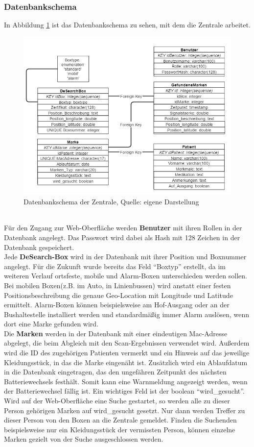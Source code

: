 \subsubsection{Datenbankschema}\label{sssec:db}
In Abbildung \ref{img:db-schema} ist das Datenbankschema zu sehen, mit dem die Zentrale arbeitet. 
\begin{figure}
	\centering
	\includegraphics[width=1.0\linewidth]{images/db-schema}
	\caption[Datenbankschema der Zentrale]{Datenbankschema der Zentrale, Quelle: eigene Darstellung}
	\label{img:db-schema}
\end{figure}
\\Für den Zugang zur Web-Oberfläche werden \textbf{Benutzer} mit ihren Rollen in der Datenbank angelegt. Das Passwort wird dabei als Hash mit 128 Zeichen in der Datenbank gespeichert. 
\\Jede \textbf{DeSearch-Box} wird in der Datenbank mit ihrer Position und Boxnummer angelegt. Für die Zukunft wurde bereits das Feld \enquote{Boxtyp} erstellt, da im weiteren Verlauf ortsfeste, mobile und Alarm-Boxen unterschieden werden sollen. Bei mobilen Boxen(z.B. im Auto, in Linienbussen) wird anstatt einer festen Positionsbeschreibung die genaue Geo-Location mit Longitude und Latitude ermittelt. Alarm-Boxen können beispielsweise am Hof-Ausgang oder an der Bushaltestelle installiert werden und standardmäßig immer Alarm auslösen, wenn dort eine Marke gefunden wird.
\\Die \textbf{Marken} werden in der Datenbank mit einer eindeutigen Mac-Adresse abgelegt, die beim Abgleich mit den Scan-Ergebnissen verwendet wird. Außerdem wird die ID des zugehörigen Patienten vermerkt und ein Hinweis auf das jeweilige Kleidungsstück, in das die Marke eingenäht ist. Zusätzlich wird ein Ablaufdatum in die Datenbank eingetragen, das den ungefähren Zeitpunkt des nächsten Batteriewechsels festhält. Somit kann eine Warnmeldung angezeigt werden, wenn der Batteriewechsel fällig ist. Ein wichtiges Feld ist der boolean \enquote{wird\_gesucht}. Wird auf der Web-Oberfläche eine Suche gestartet, so werden alle zu dieser Person gehörigen Marken auf wird\_gesucht gesetzt. Nur dann werden Treffer zu dieser Person von den Boxen an die Zentrale gemeldet. Finden die Suchenden beispielsweise nur ein Kleidungsstück der vermissten Person, können einzelne Marken gezielt von der Suche ausgeschlossen werden. 
